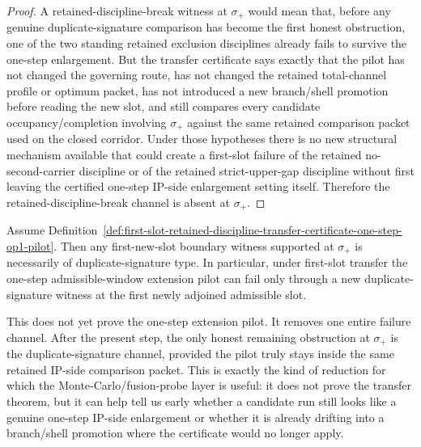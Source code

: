 \begin{proof}
A retained-discipline-break witness at $\sigma_{+}$ would mean that, before any genuine duplicate-signature comparison has become the first honest obstruction, one of the two standing retained exclusion disciplines already fails to survive the one-step enlargement. But the transfer certificate says exactly that the pilot has not changed the governing route, has not changed the retained total-channel profile or optimum packet, has not introduced a new branch/shell promotion before reading the new slot, and still compares every candidate occupancy/completion involving $\sigma_{+}$ against the same retained comparison packet used on the closed corridor. Under those hypotheses there is no new structural mechanism available that could create a first-slot failure of the retained no-second-carrier discipline or of the retained strict-upper-gap discipline without first leaving the certified one-step IP-side enlargement setting itself. Therefore the retained-discipline-break channel is absent at $\sigma_{+}$.
\end{proof}

\begin{corollary}
\label{cor:under-first-slot-transfer-boundary-witness-at-sigma-plus-is-duplicate-signature-type}
Assume Definition~\ref{def:first-slot-retained-discipline-transfer-certificate-one-step-op1-pilot}. Then any first-new-slot boundary witness supported at $\sigma_{+}$ is necessarily of duplicate-signature type. In particular, under first-slot transfer the one-step admissible-window extension pilot can fail only through a new duplicate-signature witness at the first newly adjoined admissible slot.
\end{corollary}

\begin{remark}
\label{rem:what-first-slot-retained-discipline-transfer-buys}
This does not yet prove the one-step extension pilot. It removes one entire failure channel. After the present step, the only honest remaining obstruction at $\sigma_{+}$ is the duplicate-signature channel, provided the pilot truly stays inside the same retained IP-side comparison packet. This is exactly the kind of reduction for which the Monte-Carlo/fusion-probe layer is useful: it does not prove the transfer theorem, but it can help tell us early whether a candidate run still looks like a genuine one-step IP-side enlargement or whether it is already drifting into a branch/shell promotion where the certificate would no longer apply.
\end{remark}



